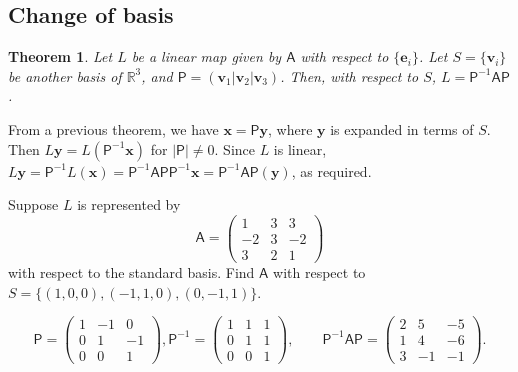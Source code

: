 \documentclass[10pt,notitlepage]{revtex4-1}
\newtheorem{theorem}{Theorem}[section]
\newenvironment{proof}[1][Proof]{\begin{trivlist}
\item[\hskip \labelsep {\bfseries #1}]}{\end{trivlist}}
\newenvironment{example}[1][Example]{\begin{trivlist}
\item[\hskip \labelsep {\bfseries #1}]}{\end{trivlist}}
\newcommand{\eb}{\boldsymbol{e}}
\newcommand{\xb}{\boldsymbol{x}}
\newcommand{\vb}{\boldsymbol{v}}
\newcommand{\yb}{\boldsymbol{y}}
\begin{document}
\subsection{Change of basis}

\begin{theorem}
	Let $L$ be a linear map given by $\mathsf{A}$ with respect to $\{\eb_i\}$.
	Let $S=\{\vb_i\}$ be another basis of $\mathbb{R}^3$, and $\mathsf{P}=(\vb_1
	|\vb_2| \vb_3)$. Then, with respect to $S$,
	$L=\mathsf{P}^{-1}\mathsf{A}\mathsf{P}$.
\end{theorem}
\begin{proof}
	From a previous theorem, we have $\xb=\mathsf{P}\yb$, where $\yb$ is
	expanded in terms of $S$. Then $L\yb=L(\mathsf{P}^{-1}\xb)$ for
	$|\mathsf{P}|\neq0$. Since $L$ is linear,
	$L\yb=\mathsf{P}^{-1}L(\xb)=\mathsf{P}^{-1}\mathsf{A}\mathsf{P}
	\mathsf{P}^{-1}\xb=\mathsf{P}^{-1}\mathsf{A}\mathsf{P}(\yb)$,
	as required.
\end{proof}

\begin{example}
	Suppose $L$ is represented by
	\begin{equation}
		\mathsf{A}=\begin{pmatrix}1&3&3\\-2&3&-2\\3&2&1\end{pmatrix}
	\end{equation}
	with respect to the standard basis. Find $\mathsf{A}$ with respect to
	$S=\{(1,0,0),(-1,1,0),(0,-1,1)\}$.
	
	\begin{equation}
		\mathsf{P}=\begin{pmatrix}1&-1&0\\0&1&-1\\0&0&1\end{pmatrix},
		\mathsf{P}^{-1}=\begin{pmatrix}1&1&1\\0&1&1\\0&0&1\end{pmatrix},\qquad
		\mathsf{P}^{-1}\mathsf{A}\mathsf{P}=
		\begin{pmatrix}2&5&-5\\1&4&-6\\3&-1&-1\end{pmatrix}.
	\end{equation}
\end{example}
\end{document}
